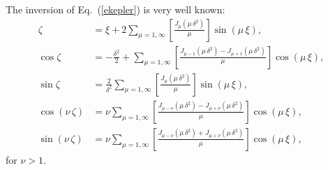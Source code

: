 \documentclass[12pt,prb,aps]{revtex4-1}
\begin{document}
The inversion of Eq.~(\ref{ekepler}) is very well known:\,\cite{bc}
\begin{align}\label{e9a1}
\zeta &= \xi + 2\sum_{\mu=1,\infty}\left[\frac{J_\mu(\mu\,\delta^2)}{\mu}\right]\sin(\mu\,\xi),\\[0.5ex]
\cos\zeta &=-\frac{\delta^2}{2}+\sum_{\mu=1,\infty}\left[\frac{J_{\mu-1}(\mu\,\delta^2)-J_{\mu+1}(\mu\,\delta^2)}{\mu}\right]\cos(\mu\,\xi),\\[0.5ex]
\sin\zeta &=\frac{2}{\delta^2}\sum_{\mu=1,\infty}\left[\frac{J_\mu(\mu\,\delta^2)}{\mu}\right]\sin(\mu\,\xi),\label{e9a3}\\[0.5ex]
\cos(\nu\,\zeta)&= \nu\sum_{\mu=1,\infty}\left[\frac{J_{\mu-\nu}(\mu\,\delta^2)-J_{\mu+\nu}(\mu\,\delta^2)}{\mu}\right]\cos(\mu\,\xi),\\[0.5ex]
\sin(\nu\,\zeta)&= \nu\sum_{\mu=1,\infty}\left[\frac{J_{\mu-\nu}(\mu\,\delta^2)+J_{\mu+\nu}(\mu\,\delta^2)}{\mu}\right]\cos(\mu\,\xi),\
\end{align}
for $\nu>1$. 
\end{document}
